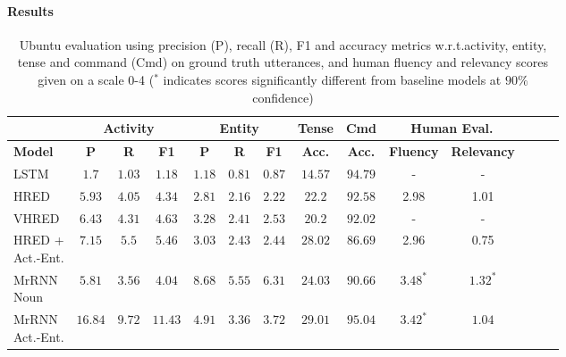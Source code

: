 \documentclass{article}
\begin{document}
\paragraph{Results}

\begin{table}[t]
  \caption{Ubuntu evaluation using precision (P), recall (R), F1 and accuracy metrics w.r.t.\@ activity, entity, tense and command (Cmd) on ground truth utterances, and human fluency and relevancy scores given on a scale 0-4 {\small ($^*$ indicates scores significantly different from baseline models at $90\%$ confidence)}} \label{tabel:ubuntu_results}
  \small
  \centering
    \begin{tabular}{lccccccccccccc}
    \toprule
     & \multicolumn{3}{c}{\textbf{Activity}} & \multicolumn{3}{c}{\textbf{Entity}} & \textbf{Tense} & \textbf{Cmd} & \multicolumn{2}{c}{\textbf{Human Eval.\@}} \\ \midrule
    \textbf{Model} & \textbf{P\@} & \textbf{R\@} & \textbf{F1} & \textbf{P\@} & \textbf{R\@} & \textbf{F1} & \textbf{Acc.\@} & \textbf{Acc.\@} & \textbf{Fluency} & \textbf{Relevancy}\\
    \midrule
        \parbox[c][2.65em][c]{0.085\textwidth}{LSTM} & $1.7$ & $1.03$ & $1.18$ & $1.18$ & $0.81$ & $0.87$ & $14.57$ & $94.79$ & - & - \\
        \parbox[c][2.65em][c]{0.085\textwidth}{HRED} & $5.93$ & $4.05$ & $4.34$ & $2.81$ & $2.16$ & $2.22$ & $22.2$ & $92.58$ & 2.98 & 1.01\\
        \parbox[c][2.65em][c]{0.085\textwidth}{VHRED} & $6.43$ & $4.31$ & $4.63$ & $3.28$ & $2.41$ & $2.53$ & $20.2$ & $92.02$ & - & - \\       
        \parbox[c][2.65em][c]{0.085\textwidth}{HRED + \\ Act.\@-Ent.\@} & $7.15$ & $5.5$ & $5.46$ & $3.03$ & $2.43$ & $2.44$ & $28.02$ & $86.69$ & 2.96 & 0.75 \\
\parbox[c][2.65em][c]{0.085\textwidth}{MrRNN \\ Noun} & $5.81$ & $3.56$ & $4.04$ & $\mathbf{8.68}$ & $\mathbf{5.55}$ & $\mathbf{6.31}$ & $24.03$ & $90.66$ & $\mathbf{3.48}^*$ & $\mathbf{1.32}^*$ \\
        \parbox[c][2.65em][c]{0.085\textwidth}{MrRNN \\ Act.\@-Ent.\@} & $\mathbf{16.84}$ & $\mathbf{9.72}$ & $\mathbf{11.43}$ & $4.91$ & $3.36$ & $3.72$ & $\mathbf{29.01}$ & $\mathbf{95.04}$ & $\mathbf{3.42}^*$ & $1.04$ \\ \bottomrule
    \end{tabular}
\end{table}
\end{document}
